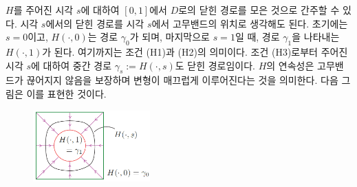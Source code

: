 $H$를 주어진 시각 $s$에 대하여
$[0,1]$에서 $D$로의 닫힌 경로를 모은 것으로 간주할 수 있다.
시각 $s$에서의 닫힌 경로를 시각 $s$에서 고무밴드의 위치로 생각해도 된다.
초기에는 $s=0$이고, $H(\cdot, 0)$는 경로 $\gamma_0$가 되며,
마지막으로 $s=1$일 때, 경로 $\gamma_1$을 나타내는
$H(\cdot, 1)$가 된다.
여기까지는 조건 (H1)과 (H2)의 의미이다.
조건 (H3)로부터 주어진 시각 $s$에 대하여 중간 경로 
$\gamma_s:= H(\cdot, s)$도 닫힌 경로임이다.
$H$의 연속성은 고무밴드가 끊어지지 않음을 보장하며
변형이 매끄럽게 이루어진다는 것을 의미한다.
다음 그림은 이를 표현한 것이다.

\begin{figure}[!h]
\begin{center}
\includegraphics[width=0.4\textwidth]{./SaltChapter/figs/fig-3-0-2}
\end{center}
\end{figure}



